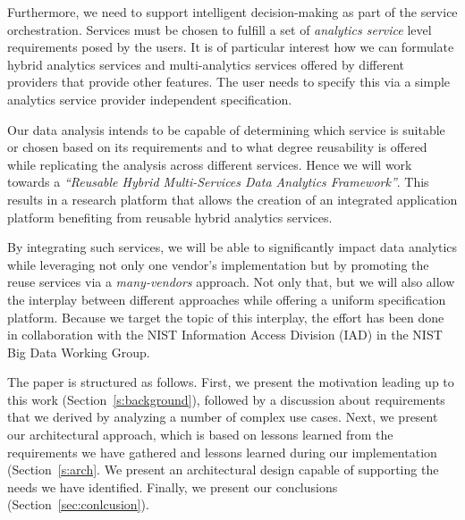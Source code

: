 Furthermore, we need to support intelligent decision-making as part of
the service orchestration. Services must be chosen to fulfill a set of
{\em analytics service} level requirements posed by the users. It is
of particular interest how we can formulate hybrid analytics services
and multi-analytics services offered by different providers that
provide other features. The user needs to specify this via a simple
analytics service provider independent specification.

Our data analysis intends to be capable of determining which service is
suitable or chosen based on its requirements and to what degree
reusability is offered while replicating the analysis across different
services. Hence we will work towards a {\em ``Reusable Hybrid
Multi-Services Data Analytics Framework''}. This results in a research
platform that allows the creation of an integrated application
platform benefiting from reusable hybrid analytics services.


By integrating such services, we will be able to significantly impact
data analytics while leveraging not only one vendor's implementation
but by promoting the reuse services via a {\em many-vendors}
approach. Not only that, but we will also allow the interplay between
different approaches while offering a uniform specification platform.
Because we target the topic of this interplay, the effort has been
done in collaboration with the NIST Information Access Division (IAD)
in the NIST Big Data Working Group.%

The paper is structured as follows. First, we present the motivation
leading up to this work (Section~\ref{s:background}), followed by a
discussion about requirements that we derived by analyzing a number of
complex use cases. Next, we present our architectural approach, which is
based on lessons learned from the requirements we have gathered and
lessons learned during our implementation (Section~\ref{s:arch}. We
present an architectural design capable of supporting the needs we
have identified. Finally, we present our conclusions
(Section~\ref{sec:conlcusion}).
